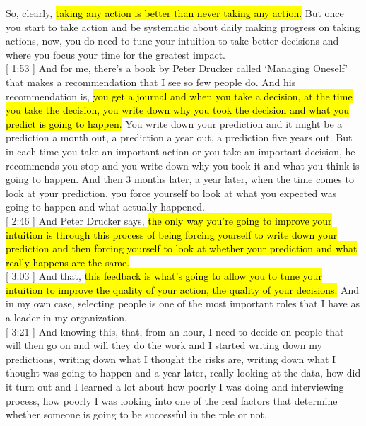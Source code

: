 \documentclass[a4paper,12pt]{article}
\begin{document}
So, clearly, \hl{taking any action is better than never taking any action.} But once you start to take action and be systematic about daily making progress on taking actions, now, you do need to tune your intuition to take better decisions and where you focus your time for the greatest impact. \\

[ 1:53 ] And for me, there's a book by Peter Drucker called `Managing Oneself' that makes a recommendation that I see so few people do. And his recommendation is, \hl{you get a journal and when you take a decision, at the time you take the decision, you write down why you took the decision and what you predict is going to happen.} You write down your prediction and it might be a prediction a month out, a prediction a year out, a prediction five years out. But in each time you take an important action or you take an important decision, he recommends you stop and you write down why you took it and what you think is going to happen. And then 3 months later, a year later, when the time comes to look at your prediction, you force yourself to look at what you expected was going to happen and what actually happened. \\

[ 2:46 ] And Peter Drucker says, \hl{the only way you're going to improve your intuition is through this process of being forcing yourself to write down your prediction and then forcing yourself to look at whether your prediction and what really happens are the same.} \\

[ 3:03 ] And that, \hl{this feedback is what's going to allow you to tune your intuition to improve the quality of your action, the quality of your decisions.} And in my own case, selecting people is one of the most important roles that I have as a leader in my organization. \\

[ 3:21 ] And knowing this, that, from an hour, I need to decide on people that will then go on and will they do the work and I started writing down my predictions, writing down what I thought the risks are, writing down what I thought was going to happen and a year later, really looking at the data, how did it turn out and I learned a lot about how poorly I was doing and interviewing process, how poorly I was looking into one of the real factors that determine whether someone is going to be successful in the role or not. \\
\end{document}
